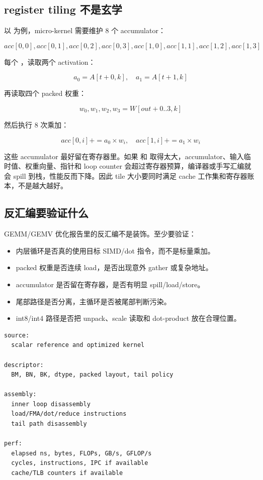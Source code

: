 \subsection{register tiling 不是玄学}

以  为例，micro-kernel 需要维护 8 个 accumulator：

\[
acc[0,0], acc[0,1], acc[0,2], acc[0,3],
acc[1,0], acc[1,1], acc[1,2], acc[1,3]
\]

每个 ，读取两个 activation：

\[
a_0 = A[t+0,k], \quad a_1 = A[t+1,k]
\]

再读取四个 packed 权重：

\[
w_0,w_1,w_2,w_3 = W[out+0..3,k]
\]

然后执行 8 次乘加：

\[
acc[0,i] += a_0 \times w_i,\quad
acc[1,i] += a_1 \times w_i
\]

这些 accumulator 最好留在寄存器里。如果  和  取得太大，accumulator、输入临时值、权重向量、指针和 loop counter 会超过寄存器预算，编译器或手写汇编就会 spill 到栈，性能反而下降。因此 tile 大小要同时满足 cache 工作集和寄存器账本，不是越大越好。

\subsection{反汇编要验证什么}

GEMM/GEMV 优化报告里的反汇编不是装饰。至少要验证：

\begin{itemize}
  \item 内层循环是否真的使用目标 SIMD/dot 指令，而不是标量乘加。
  \item packed 权重是否连续 load，是否出现意外 gather 或复杂地址。
  \item accumulator 是否留在寄存器，是否有明显 spill/load/store。
  \item 尾部路径是否分离，主循环是否被尾部判断污染。
  \item int8/int4 路径是否把 unpack、scale 读取和 dot-product 放在合理位置。
\end{itemize}

\begin{lstlisting}[numbers=none,caption={micro-kernel 报告必须贴出的材料}]
source:
  scalar reference and optimized kernel

descriptor:
  BM, BN, BK, dtype, packed layout, tail policy

assembly:
  inner loop disassembly
  load/FMA/dot/reduce instructions
  tail path disassembly

perf:
  elapsed ns, bytes, FLOPs, GB/s, GFLOP/s
  cycles, instructions, IPC if available
  cache/TLB counters if available
\end{lstlisting}


